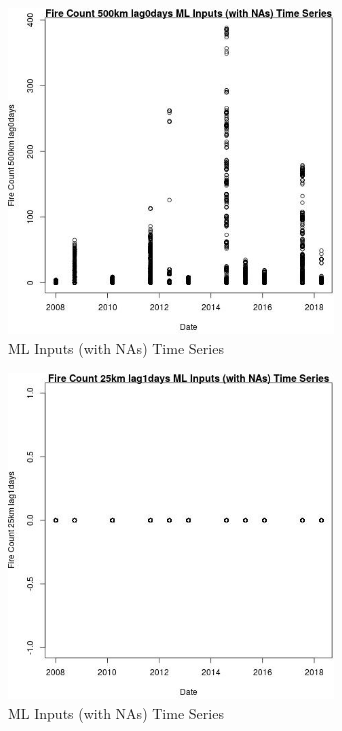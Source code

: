 \begin{figure} 
\centering  
\includegraphics[width=0.77\textwidth]{Code_Outputs/Report_ML_input_PM25_Step4_part_e_de_duplicated_aves_compiled_2019-05-18wNAs_Fire_Count_500km_lag0daysvDate.jpg} 
\caption{\label{fig:Report_ML_input_PM25_Step4_part_e_de_duplicated_aves_compiled_2019-05-18wNAsFire_Count_500km_lag0daysvDate}ML Inputs (with NAs) Time Series} 
\end{figure} 
 

\begin{figure} 
\centering  
\includegraphics[width=0.77\textwidth]{Code_Outputs/Report_ML_input_PM25_Step4_part_e_de_duplicated_aves_compiled_2019-05-18wNAs_Fire_Count_25km_lag1daysvDate.jpg} 
\caption{\label{fig:Report_ML_input_PM25_Step4_part_e_de_duplicated_aves_compiled_2019-05-18wNAsFire_Count_25km_lag1daysvDate}ML Inputs (with NAs) Time Series} 
\end{figure} 
 

